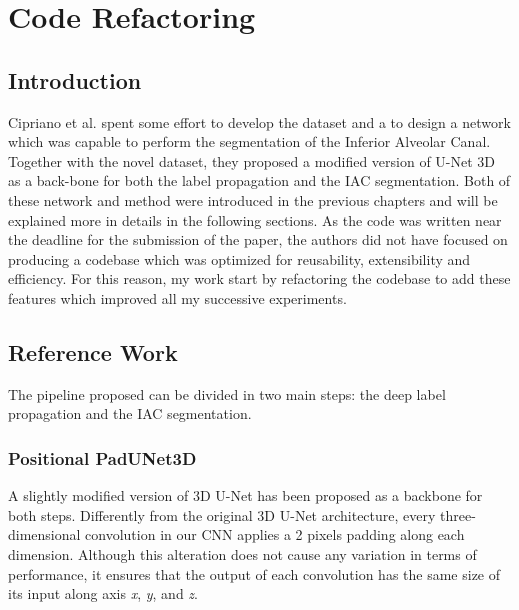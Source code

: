 
\chapter{Code Refactoring}

\label{chp:refwork}

\def\:{\hskip0pt} %
\section{Introduction}
Cipriano et al. spent some effort to develop the dataset and a to design a
network which was capable to perform the segmentation of the Inferior Alveolar
Canal.
Together with the novel dataset, they proposed a modified version of
U-Net 3D as a back-bone for both the label propagation and the IAC segmentation.
Both of these network and method were introduced in the previous
chapters and will be explained more in details in the following sections.
As the code was written near the deadline for the submission of the paper,
the authors did not have focused on producing a codebase which was optimized for
reusability, extensibility and efficiency.
For this reason, my work start by refactoring the codebase to add these features
which improved all my successive experiments.

\section{Reference Work}
The pipeline proposed can be divided in two main steps: the deep label
propagation and the IAC segmentation.

\subsection{Positional PadUNet3D}
A slightly modified version of 3D U-Net has been proposed as a backbone for both
steps. Differently from the original 3D U-Net architecture, every
three-dimensional convolution in our CNN applies a 2 pixels padding along each
dimension. Although this alteration does not cause any variation in terms of
performance, it ensures that the output of each convolution has the same size of
its input along axis \emph{x}, \emph{y}, and \emph{z}.

